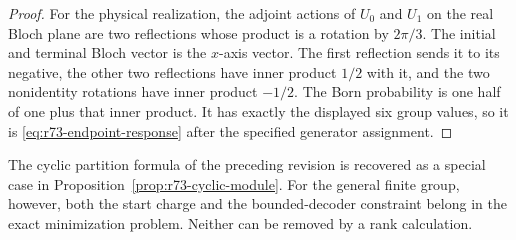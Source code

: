 \begin{proof}
For the physical realization, the adjoint actions of $U_0$ and $U_1$ on
the real Bloch plane are two reflections whose product is a rotation by
$2\pi/3$. The initial and terminal Bloch vector is the $x$-axis vector.
The first reflection sends it to its negative, the other two reflections
have inner product $1/2$ with it, and the two nonidentity rotations have
inner product $-1/2$. The Born probability is one half of one plus that
inner product. It has exactly the displayed six group values, so it is
\eqref{eq:r73-endpoint-response} after the specified generator assignment.
\end{proof}

The cyclic partition formula of the preceding revision is recovered as a
special case in Proposition~\ref{prop:r73-cyclic-module}. For the general
finite group, however, both the start charge and the bounded-decoder
constraint belong in the exact minimization problem. Neither can be
removed by a rank calculation.
